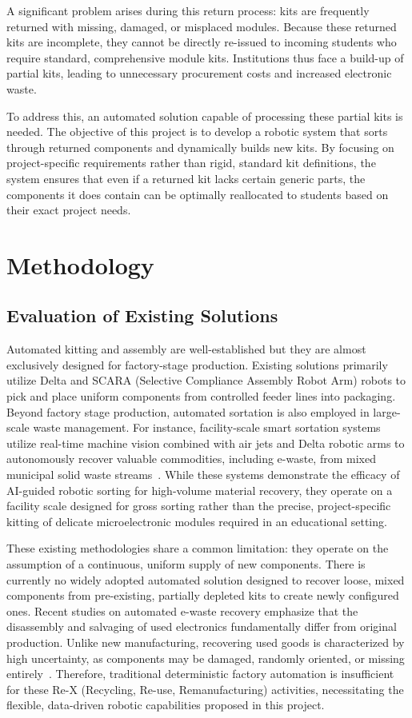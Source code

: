 \documentclass{MIPRO}
\begin{document}
A significant problem arises during this return process: kits are frequently returned with missing, damaged, or misplaced modules. Because these returned kits are incomplete, they cannot be directly re-issued to incoming students who require standard, comprehensive module kits. Institutions thus face a build-up of partial kits, leading to unnecessary procurement costs and increased electronic waste.

To address this, an automated solution capable of processing these partial kits is needed. The objective of this project is to develop a robotic system that sorts through returned components and dynamically builds new kits. By focusing on project-specific requirements rather than rigid, standard kit definitions, the system ensures that even if a returned kit lacks certain generic parts, the components it does contain can be optimally reallocated to students based on their exact project needs.

\section{Methodology}

\subsection{Evaluation of Existing Solutions}

Automated kitting and assembly are well-established but they are almost exclusively designed for factory-stage production. Existing solutions primarily utilize Delta and SCARA (Selective Compliance Assembly Robot Arm) robots to pick and place uniform components from controlled feeder lines into packaging. Beyond factory stage production, automated sortation is also employed in large-scale waste management. For instance, facility-scale smart sortation systems utilize real-time machine vision combined with air jets and Delta robotic arms to autonomously recover valuable commodities, including e-waste, from mixed municipal solid waste streams~\cite{amp}. While these systems demonstrate the efficacy of AI-guided robotic sorting for high-volume material recovery, they operate on a facility scale designed for gross sorting rather than the precise, project-specific kitting of delicate microelectronic modules required in an educational setting.

These existing methodologies share a common limitation: they operate on the assumption of a continuous, uniform supply of new components. There is currently no widely adopted automated solution designed to recover loose, mixed components from pre-existing, partially depleted kits to create newly configured ones. Recent studies on automated e-waste recovery emphasize that the disassembly and salvaging of used electronics fundamentally differ from original production. Unlike new manufacturing, recovering used goods is characterized by high uncertainty, as components may be damaged, randomly oriented, or missing entirely~\cite{saenz}. Therefore, traditional deterministic factory automation is insufficient for these Re-X (Recycling, Re-use, Remanufacturing) activities, necessitating the flexible, data-driven robotic capabilities proposed in this project.
\end{document}
